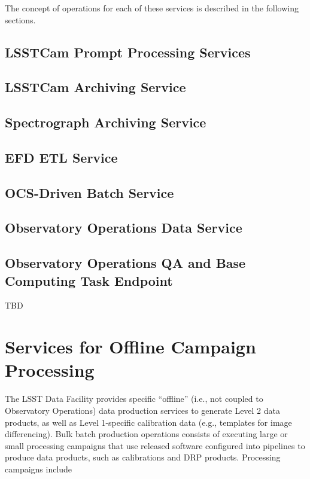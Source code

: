 The concept of operations for each of these services is described in the
following sections.

\subsection{LSSTCam Prompt Processing Services}


\subsection{LSSTCam Archiving Service}


\subsection{Spectrograph Archiving Service}


\subsection{EFD ETL Service}


\subsection{OCS-Driven Batch Service}


\subsection{Observatory Operations Data Service}


\subsection{Observatory Operations QA and Base Computing Task Endpoint}
TBD
% 

\section{Services for Offline Campaign Processing}

The LSST Data Facility provides specific “offline” (i.e., not coupled to
Observatory Operations) data production services to generate Level 2 data
products, as well as Level 1-specific calibration data (e.g., templates for
image differencing). Bulk batch production operations consists of executing
large or small processing campaigns that use released software configured into
pipelines to produce data products, such as calibrations and DRP products.
Processing campaigns include

